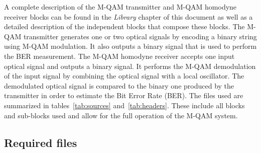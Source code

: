 \begin{refsection}
A complete description of the M-QAM transmitter and M-QAM homodyne receiver blocks can be found in the \textit{Library} chapter of this document as well as a detailed description of the independent blocks that compose these blocks.
The M-QAM transmitter generates one or two optical signals by encoding a binary string using M-QAM modulation. It also outputs a binary signal that is used to perform the BER measurement.
The M-QAM homodyne receiver accepts one input optical signal and outputs
a binary signal. It performs the M-QAM demodulation of the input signal by combining the optical signal with a local oscillator.
The demodulated optical signal is compared to the binary one produced by the transmitter in order to estimate the Bit Error Rate (BER).
The files used are summarized in tables~\ref{tab:sources} and~\ref{tab:headers}. These include all blocks and sub-blocks used and allow for the full operation of the M-QAM system.

\subsection*{Required files}\label{RequiredFilesMQAM}


\end{refsection}
